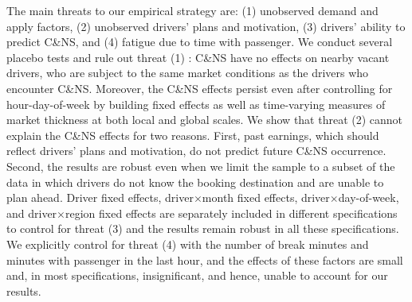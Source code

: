 \documentclass[reviewmode,AEJ]{AEA}
\begin{document}


The main threats to our empirical strategy are: (1) unobserved demand and apply factors, (2) unobserved drivers' plans and motivation, (3) drivers' ability to predict C\&NS, and (4) fatigue due to time with passenger.
We conduct several placebo tests and rule out threat (1)%
: C\&NS have no effects on nearby vacant drivers, who are subject to the same market conditions as the drivers who encounter C\&NS. Moreover, the C\&NS effects persist even after controlling for hour-day-of-week by building fixed effects as well as time-varying measures of market thickness at both local and global scales. We show that threat (2) %
cannot explain the C\&NS effects for two reasons. First, past earnings, which should reflect drivers' plans and motivation, do not predict future C\&NS occurrence. Second, the results are robust even when we limit the sample to a subset of the data in which drivers do not know the booking destination and are unable to plan ahead. Driver fixed effects, driver\(\times\)month fixed effects, driver\(\times\)day-of-week, and driver\(\times\)region fixed effects are separately included in different specifications to control for threat (3) %
and the results remain robust in all these specifications. We explicitly control for threat (4) %
with the number of break minutes and minutes with passenger in the last hour, and the effects of these factors are small and, in most specifications, insignificant, and hence, unable to account for our results.
\end{document}
